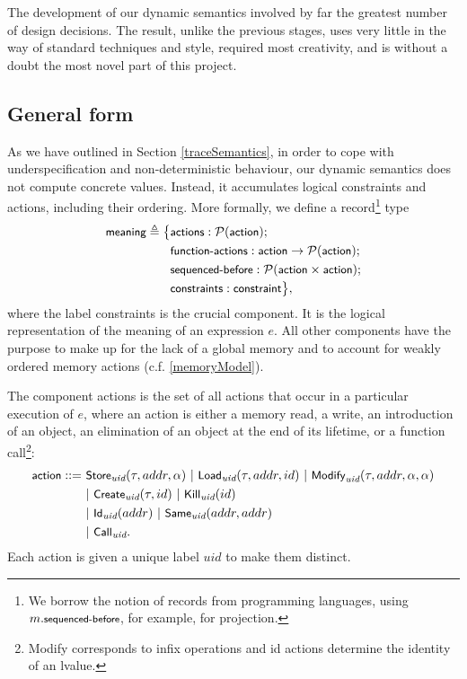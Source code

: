 \documentclass[a4paper,12pt]{scrbook}
\theoremstyle{plain}
\theoremstyle{definition}
\newcommand{\sem}[1]{{\small{\textsf{#1}}}}
\newcommand{\proj}[2]{
  #2.\sem{#1}
}
\newcommand{\define}[0]{\triangleq}
\begin{document}
The development of our dynamic semantics involved by far the greatest number of
design decisions. The result, unlike the previous stages, uses very little in
the way of standard techniques and style, required most creativity, and is
without a doubt the most novel part of this project.

\subsection{General form}\label{generalForm}
As we have outlined in Section \ref{traceSemantics}, in order to cope with
underspecification and non-deterministic behaviour, our dynamic semantics does
not compute concrete values. Instead, it accumulates logical constraints and
actions, including their ordering. More formally, we define a record\footnote{We
  borrow the notion of records from programming languages, using
  $\proj{\sem{\footnotesize{sequenced-before}}}{m}$, for example, for
  projection.} type
\begin{equation*}
   \begin{aligned}
    \sem{meaning} \define \big\{&\sem{actions} : \mathcal P (\sem{action});\\
    &\sem{function-actions} : \sem{action} \rightarrow \mathcal P (\sem{action}); \\
    &\sem{sequenced-before} : \mathcal P (\sem{action} \times \sem{action}); \\
    &\sem{constraints} : \sem{constraint} \big\} ,
  \end{aligned}
\end{equation*}
where the label \sem{constraints} is the crucial component. It is the logical
representation of the meaning of an expression $e$. All other components have
the purpose to make up for the lack of a global memory and to account for weakly
ordered memory actions (c.f. \ref{memoryModel}).

The component \sem{actions} is the set of all actions that occur in a particular
execution of $e$, where an action is either a memory read, a write, an
introduction of an object, an elimination of an object at the end of its
lifetime, or a function call\footnote{Modify corresponds to infix operations and
  id actions determine the identity of an lvalue.}:
\begin{align*}
  \sem{action} ::= ~&
  \sem{Store}_\textit{uid} (\tau, addr, \alpha) ~|~
  \sem{Load}_\textit{uid} (\tau, addr, id) ~|~
  \sem{Modify}_\textit{uid} (\tau, addr, \alpha, \alpha)  \\
&|~ \sem{Create}_\textit{uid}(\tau, id) ~|~
  \sem{Kill}_\textit{uid} (id)  \\
&|~ \sem{Id}_\textit{uid} (addr) ~|~
  \sem{Same}_\textit{uid} (addr, addr) \\
&|~ \sem{Call}_\textit{uid} .
\end{align*}
Each action is given a unique label $\textit{uid}$ to make them distinct.
\end{document}
